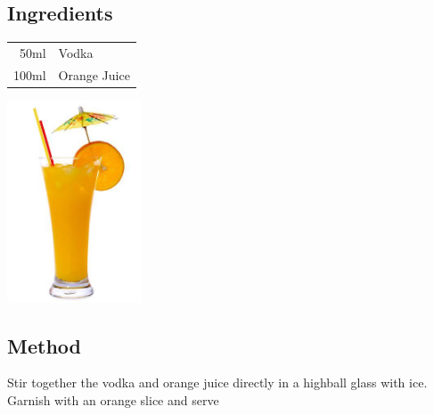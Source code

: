 \documentclass[12pt, letterpaper]{article}
\begin{document}
\subsection*{Ingredients}

\begin{multicols}{2}

\begin{tabular} { r | l}
    50ml & Vodka \\
    100ml & Orange Juice  \\
\end{tabular}

\includegraphics[height=6cm]{screwdriver}

\end{multicols}

\subsection*{Method}
Stir together the vodka and orange juice directly in a highball glass with ice.
Garnish with an orange slice and serve
\end{document}
